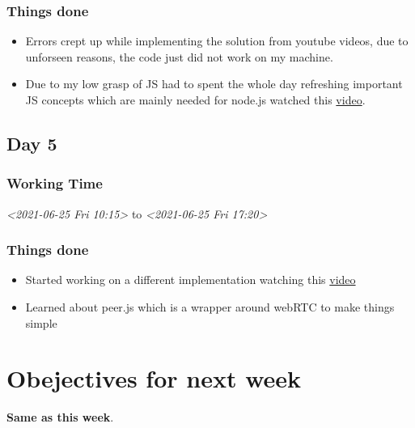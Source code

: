 \documentclass[11pt]{article}
\begin{document}
\subsubsection*{Things done}
\label{sec:org77947c3}
\begin{itemize}
\item Errors crept up while implementing the solution from youtube videos,
due to unforseen reasons, the code just did not work on my machine.
\item Due to my low grasp of JS had to spent the whole day refreshing important
JS concepts which are mainly needed for node.js
watched this \href{https://www.youtube.com/watch?v=NCwa\_xi0Uuc}{video}.
\end{itemize}

\subsection*{Day 5}
\label{sec:org4744ff2}
\subsubsection*{Working Time}
\label{sec:org25e7a01}
\textit{<2021-06-25 Fri 10:15> } to \textit{<2021-06-25 Fri 17:20>}

\subsubsection*{Things done}
\label{sec:org719753b}
\begin{itemize}
\item Started working on a different implementation watching this \href{https://www.youtube.com/watch?v=DvlyzDZDEq4\&t=790s}{video}
\item Learned about peer.js which is a wrapper around webRTC to make things simple
\end{itemize}

\section*{Obejectives for next week}
\label{sec:org94fbb92}
\textbf{Same as this week}.
\end{document}
